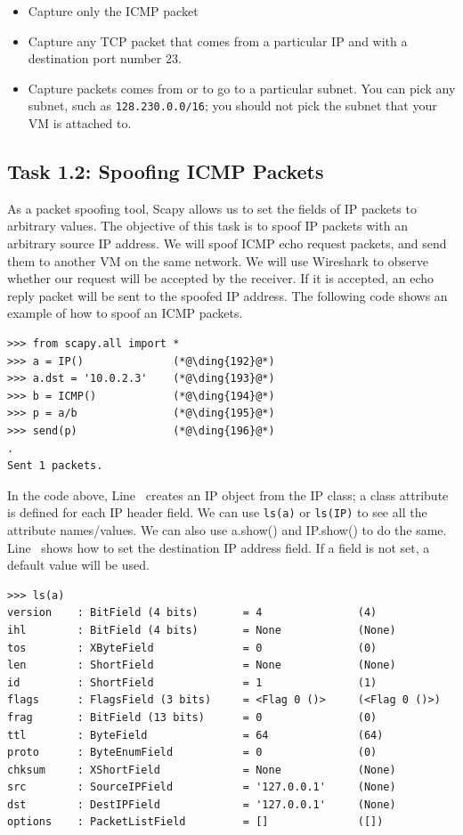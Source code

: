 \begin{itemize} 
 \item Capture only the ICMP packet
 \item Capture any TCP packet that comes from a particular IP and with 
 a destination port number 23. 
 \item Capture packets comes from or to go to a particular subnet. You can
 pick any subnet, such as \texttt{128.230.0.0/16}; you should not 
 pick the subnet that your VM is attached to. 
\end{itemize} 



\subsection{Task 1.2: Spoofing ICMP Packets}

As a packet spoofing tool, Scapy allows us to set the fields of 
IP packets to arbitrary values. The objective of this 
task is to spoof IP packets with an arbitrary source IP address. 
We will spoof ICMP echo request packets, and send them to another VM on
the same network. We will use Wireshark to observe
whether our request will be accepted by the receiver. If it is accepted, an
echo reply packet will be sent to the spoofed IP address. 
The following code shows an example of how to spoof an ICMP packets.


\begin{lstlisting}
>>> from scapy.all import *
>>> a = IP()              (*@\ding{192}@*)
>>> a.dst = '10.0.2.3'    (*@\ding{193}@*)
>>> b = ICMP()            (*@\ding{194}@*)
>>> p = a/b               (*@\ding{195}@*)
>>> send(p)               (*@\ding{196}@*)
.
Sent 1 packets.
\end{lstlisting}
 

In the code above, Line~ creates an IP object from the IP class; 
a class attribute is defined for each IP header field. We
can use \texttt{ls(a)} or \texttt{ls(IP)} to see all 
the attribute names/values. We can also use a.show() and IP.show() to do
the same. Line~ shows how to set the destination 
IP address field. If a field is not set, a default value will be 
used. 

\begin{lstlisting}
>>> ls(a)
version    : BitField (4 bits)       = 4               (4)
ihl        : BitField (4 bits)       = None            (None)
tos        : XByteField              = 0               (0)
len        : ShortField              = None            (None)
id         : ShortField              = 1               (1)
flags      : FlagsField (3 bits)     = <Flag 0 ()>     (<Flag 0 ()>)
frag       : BitField (13 bits)      = 0               (0)
ttl        : ByteField               = 64              (64)
proto      : ByteEnumField           = 0               (0)
chksum     : XShortField             = None            (None)
src        : SourceIPField           = '127.0.0.1'     (None)
dst        : DestIPField             = '127.0.0.1'     (None)
options    : PacketListField         = []              ([])
\end{lstlisting}
 

